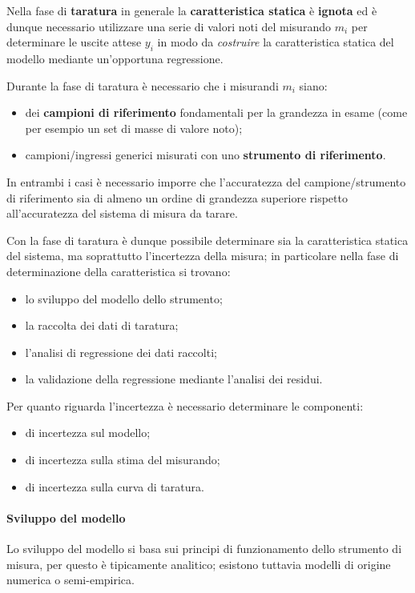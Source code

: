 	Nella fase di \textbf{taratura} in generale la \textbf{caratteristica statica} è \textbf{ignota} ed è dunque necessario utilizzare una serie di valori noti del misurando $m_i$ per determinare le uscite attese $y_i$ in modo da \textit{costruire} la caratteristica statica del modello mediante un'opportuna regressione.
	
	
	Durante la fase di taratura è necessario che i misurandi $m_i$ siano:
	\begin{itemize}
		\item dei \textbf{campioni di riferimento} fondamentali per la grandezza in esame (come per esempio un set di masse di valore noto);
		\item campioni/ingressi generici misurati con uno \textbf{strumento di riferimento}.
	\end{itemize}
	In entrambi i casi è necessario imporre che l'accuratezza del campione/strumento di riferimento sia di almeno un ordine di grandezza superiore rispetto all'accuratezza del sistema di misura da tarare.
	
	Con la fase di taratura è dunque possibile determinare sia la caratteristica statica del sistema, ma soprattutto l'incertezza della misura; in particolare nella fase di determinazione della caratteristica si trovano:
	\begin{itemize}
		\item lo sviluppo del modello dello strumento;
		\item la raccolta dei dati di taratura;
		\item l'analisi di regressione dei dati raccolti;
		\item la validazione della regressione mediante l'analisi dei residui.
	\end{itemize}
	Per quanto riguarda l'incertezza è necessario determinare le componenti:
	\begin{itemize}
		\item di incertezza sul modello;
		\item di incertezza sulla stima del misurando;
		\item di incertezza sulla curva di taratura.
	\end{itemize}
	
	\paragraph{Sviluppo del modello} Lo sviluppo del modello si basa sui principi di funzionamento dello strumento di misura, per questo è tipicamente analitico; esistono tuttavia modelli di origine numerica o semi-empirica.
	
